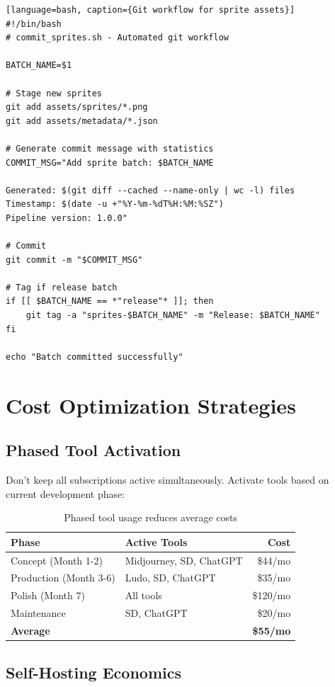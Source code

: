 \documentclass[11pt]{article}
\begin{document}
\begin{verbatim}[language=bash, caption={Git workflow for sprite assets}]
#!/bin/bash
# commit_sprites.sh - Automated git workflow

BATCH_NAME=$1

# Stage new sprites
git add assets/sprites/*.png
git add assets/metadata/*.json

# Generate commit message with statistics
COMMIT_MSG="Add sprite batch: $BATCH_NAME

Generated: $(git diff --cached --name-only | wc -l) files
Timestamp: $(date -u +"%Y-%m-%dT%H:%M:%SZ")
Pipeline version: 1.0.0"

# Commit
git commit -m "$COMMIT_MSG"

# Tag if release batch
if [[ $BATCH_NAME == *"release"* ]]; then
    git tag -a "sprites-$BATCH_NAME" -m "Release: $BATCH_NAME"
fi

echo "Batch committed successfully"
\end{verbatim}

\section{Cost Optimization Strategies}

\subsection{Phased Tool Activation}

Don't keep all subscriptions active simultaneously. Activate tools based on current development phase:

\begin{table}[H]
\centering
\begin{tabular}{lp{7cm}r}
\toprule
\textbf{Phase} & \textbf{Active Tools} & \textbf{Cost} \\
\midrule
Concept (Month 1-2) & Midjourney, SD, ChatGPT & \$44/mo \\
Production (Month 3-6) & Ludo, SD, ChatGPT & \$35/mo \\
Polish (Month 7) & All tools & \$120/mo \\
Maintenance & SD, ChatGPT & \$20/mo \\
\midrule
\textbf{Average} & & \textbf{\$55/mo} \\
\bottomrule
\end{tabular}
\caption{Phased tool usage reduces average costs}
\end{table}

\subsection{Self-Hosting Economics}
\end{document}
